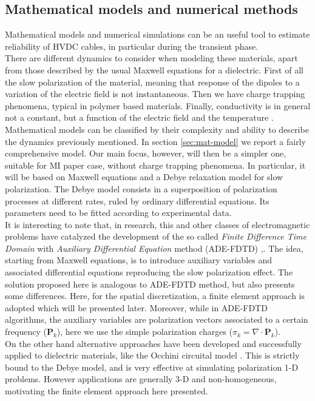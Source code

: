\documentclass[11pt,a4paper]{article}
\begin{document}
\subsection{Mathematical models and numerical methods}
Mathematical models and numerical simulations can be an useful tool to estimate reliability of HVDC cables, in particular during the transient phase.\\
There are different dynamics to consider when modeling these materials, apart from those described by the usual Maxwell equations for a dielectric. First of all the slow polarization of the material, meaning that response of the dipoles to a variation of the electric field is not instantaneous. Then we have charge trapping phenomena, typical in polymer based materials. Finally, conductivity is in general not a constant, but a function of the electric field and the temperature \cite{time-dep-layered}.\\
Mathematical models can be classified by their complexity and ability to describe the dynamics previously mentioned. In section \ref{sec:mat-model} we report a fairly comprehensive model. Our main focus, however, will then be a simpler one, suitable for MI paper case, without charge trapping phenomena. In particular, it will be based on Maxwell equations and a Debye relaxation model for slow polarization. The Debye model consists in a superposition of polarization processes at different rates, ruled by ordinary differential equations. Its parameters need to be fitted according to experimental data.\\
It is interesting to note that, in research, this and other classes of electromagnetic problems have catalyzed the development of the so called \textit{Finite Difference Time Domain} with \textit{Auxiliary Differential Equation} method (ADE-FDTD) \cite{ADE-FDTD-thesis},\cite{ADE-FDTD-art}. The idea, starting from Maxwell equations, is to introduce auxiliary variables and associated differential equations reproducing the slow polarization effect. The solution proposed here is analogous to ADE-FDTD method, but also presents some differences. Here, for the spatial discretization, a finite element approach is adopted which will be presented later. Moreover, while in ADE-FDTD algorithms, the auxiliary variables are polarization vectors associated to a certain frequency (\(\mathbf{P}_k\)), here we use the simple polarization charges (\(\pi_k=\nabla \cdot\mathbf{P}_k\)).\\
On the other hand alternative approaches have been developed and successfully applied to dielectric materials, like the Occhini circuital model \cite{simulation-transient-HVDC}. This is strictly bound to the Debye model, and is very effective at simulating polarization 1-D problems. However applications are generally 3-D and non-homogeneous, motivating the finite element approach here presented.
\end{document}

